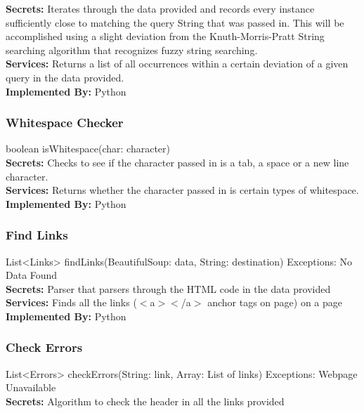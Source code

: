 \documentclass[titlepage]{article}
\begin{document}
\textbf{Secrets:}
Iterates through the data provided and records every instance sufficiently close to matching the query String that was passed in. This will be accomplished using a slight deviation from the Knuth-Morris-Pratt String searching algorithm that recognizes fuzzy string searching.\\

\textbf{Services:}
Returns a list of all occurrences within a certain deviation of a given query in the data provided.\\

\textbf{Implemented By:}
Python

\subsubsection{Whitespace Checker}
boolean isWhitespace(char: character)\\

\textbf{Secrets:}
Checks to see if the character passed in is a tab, a space or a new line character.\\

\textbf{Services:}
Returns whether the character passed in is certain types of whitespace.\\

\textbf{Implemented By:}
Python

\subsubsection{Find Links}
List<Links> findLinks(BeautifulSoup: data, String: destination) Exceptions: No Data Found\\

\textbf{Secrets:}
Parser that parsers through the HTML code in the data provided\\

\textbf{Services:}
Finds all the links ($<$a$>$$<$/a$>$ anchor tags on page) on a page \\

\textbf{Implemented By:}
Python

\subsubsection{Check Errors}
List<Errors> checkErrors(String: link, Array: List of links) Exceptions: Webpage Unavailable\\

\textbf{Secrets:}
Algorithm to check the header in all the links provided \\
\end{document}
